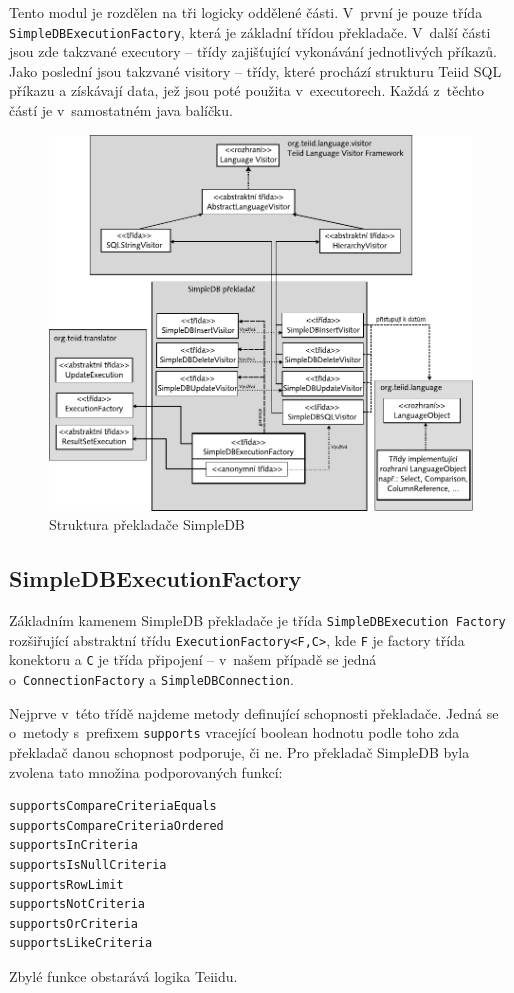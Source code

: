 \documentclass[oneside,12pt,final]{fithesis2}
\begin{document}
Tento modul je rozdělen na tři logicky oddělené části. V~první je pouze třída \texttt{SimpleDBExecutionFactory}, která je základní třídou překladače. V~další části jsou zde takzvané executory -- třídy zajišťující vykonávání jednotlivých příkazů. Jako poslední jsou takzvané visitory -- třídy, které prochází strukturu Teiid SQL příkazu a získávají data, jež jsou poté použita v~executorech. Každá z~těchto částí je v~samostatném java balíčku.
\begin{figure}[h]
 \centering
 \includegraphics[scale=0.8]{TranslatorStructure}
 \caption{Struktura překladače SimpleDB}
\end{figure}
\subsection{SimpleDBExecutionFactory}
Základním kamenem SimpleDB překladače je třída \texttt{SimpleDBExecution Factory} rozšiřující abstraktní třídu \texttt{ExecutionFactory<F,C>}, kde \texttt{F} je factory třída konektoru a \texttt{C} je třída připojení -- v~našem případě se jedná o~\texttt{ConnectionFactory} a \texttt{SimpleDBConnection}.

Nejprve v~této třídě najdeme metody definující schopnosti překladače. Jedná se o~metody s~prefixem \texttt{supports} vracející boolean hodnotu podle toho zda překladač danou schopnost podporuje, či ne. Pro překladač SimpleDB byla zvolena tato množina podporovaných funkcí: 
\begin{verbatim}
supportsCompareCriteriaEquals
supportsCompareCriteriaOrdered
supportsInCriteria
supportsIsNullCriteria
supportsRowLimit
supportsNotCriteria
supportsOrCriteria
supportsLikeCriteria
\end{verbatim}
Zbylé funkce obstarává logika Teiidu.
\end{document}
